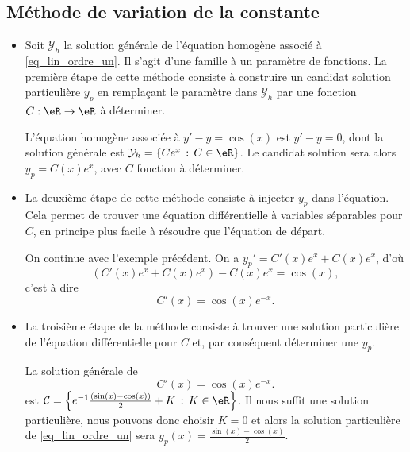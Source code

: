 \subsection{Méthode de variation de la constante}

\begin{itemize}
\item Soit $\mathcal{Y}_h$ la solution générale de l'équation homogène associé à \eqref{eq_lin_ordre_un}. Il s'agit d'une famille à un paramètre de fonctions. La première étape de cette méthode consiste à construire un candidat solution particulière $y_p$ en remplaçant le paramètre dans  $\mathcal{Y}_h$ par une fonction $C: \eR \to\eR$ à déterminer. 

  \begin{example}
    L'équation homogène associée à $y'-y = \cos(x)$ est $y' - y = 0$, dont la solution générale est $\mathcal{Y}_h = \{Ce^x \,:\, C\in\eR\}$. Le candidat solution sera alors $y_p = C(x)e^x$, avec $C$ fonction à déterminer.
  \end{example}

 \item  La deuxième étape de cette méthode consiste à injecter $y_p$ dans l'équation. Cela permet de trouver une équation différentielle  à variables séparables pour $C$, en principe plus facile à résoudre que l'équation de départ.
 
  \begin{example}
    On continue avec l'exemple précédent. On a $y_p' = C'(x) e^x + C(x) e^x$, d'où 
    \[
    (C'(x) e^x + C(x) e^x) - C(x) e^x = \cos(x),
    \]
    c'est à dire 
    \[
    C'(x)  = \cos(x)e^{-x}.
    \]
  \end{example}
\item  La troisième étape de la méthode consiste à trouver une solution particulière de l'équation différentielle pour $C$ et, par conséquent déterminer une $y_p$.

  \begin{example}
    La solution générale de 
    \[
    C'(x)  = \cos(x)e^{-x}.
    \]
    est $\mathcal{C} = \left\{e^{-1}\frac{(\sin(x)-\cos(x))}{2} +K \,:\, K\in\eR\right\}$. Il nous suffit une solution particulière, nous pouvons donc choisir $K=0$ et alors la solution particulière de \eqref{eq_lin_ordre_un} sera $y_p (x)= \frac{\sin(x)-\cos(x)}{2} $.
  \end{example}
\end{itemize}
